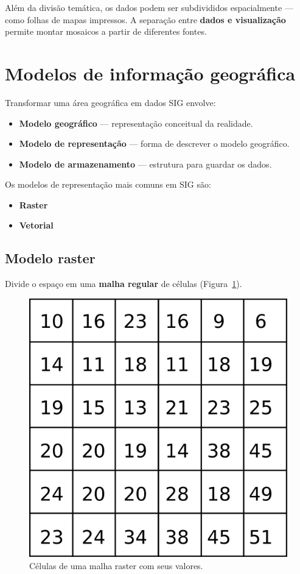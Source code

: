 Além da divisão temática, os dados podem ser subdivididos espacialmente — como folhas de mapas impressos. A separação entre \textbf{dados e visualização} permite montar mosaicos a partir de diferentes fontes.

\section{Modelos de informação geográfica}

Transformar uma área geográfica em dados SIG envolve:

\begin{itemize}
\item \textbf{Modelo geográfico} — representação conceitual da realidade.
\item \textbf{Modelo de representação} — forma de descrever o modelo geográfico.
\item \textbf{Modelo de armazenamento} — estrutura para guardar os dados.
\end{itemize}

Os modelos de representação mais comuns em SIG são:

\begin{itemize}
\item \textbf{Raster}
\item \textbf{Vetorial}
\end{itemize}

\subsection{Modelo raster}

Divide o espaço em uma \textbf{malha regular} de células (Figura~\ref{Fig:Raster_closeup}).

\begin{figure}[!hbt]   
\centering
\includegraphics[width=.4\textwidth]{dados/Raster_closeup.png}
\caption{\small Células de uma malha raster com seus valores.}
\label{Fig:Raster_closeup} 
\end{figure}

